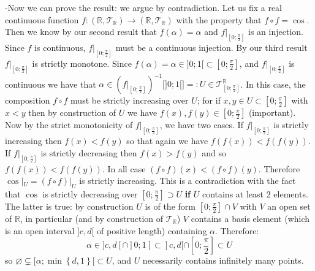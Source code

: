 \begin{solution}
    -Now we can prove the result: we argue by contradiction. Let us fix a real continuous function \( f:\left(\mathbb{R},\mathcal{T}_{\mathbb{R}}\right)\longrightarrow\left(\mathbb{R},\mathcal{T}_{\mathbb{R}}\right) \) with the property that \( f\circ f=\cos \). Then we know by our second result that \( f\left(\alpha\right)=\alpha \) and \( f|_{\left[0;\frac{\pi}{2}\right]} \) is an injection. Since \( f \) is continuous, \( f|_{\left[0;\frac{\pi}{2}\right]} \) must be a continuous injection. By our third result \( f|_{\left[0;\frac{\pi}{2}\right]} \) is strictly monotone. Since \( f\left(\alpha\right)=\alpha\in]0;1[\subset \left[0;\frac{\pi}{2}\right] \), and \( f|_{\left[0;\frac{\pi}{2}\right]} \) is continuous we have that \( \alpha\in \left(f|_{\left[0;\frac{\pi}{2}\right]}\right)^{-1}\big[]0;1[\big]=:U\in\mathcal{T}_{\left[0;\frac{\pi}{2}\right]}^{\mathbb{R}} \). In this case, the composition \( f\circ f \) must be strictly increasing over \( U \); for if \( x,y\in U\subset \left[0;\frac{\pi}{2}\right] \) with \( x<y \) then by construction of \( U \) we have \( f\left(x\right),f\left(y\right)\in \left[0;\frac{\pi}{2}\right] \) (important). Now by the strict monotonicity of \( f|_{\left[0;\frac{\pi}{2}\right]} \), we have two cases. If \( f|_{\left[0;\frac{\pi}{2}\right]} \) is strictly increasing then \( f\left(x\right)<f\left(y\right) \) so that again we have \( f\left(f\left(x\right)\right)<f\left(f\left(y\right)\right) \). If \( f|_{\left[0;\frac{\pi}{2}\right]} \) is strictly decreasing then \( f\left(x\right)>f\left(y\right) \) and so \( f\left(f\left(x\right)\right)<f\left(f\left(y\right)\right) \). In all case \( \left(f\circ f\right)\left(x\right)<\left(f\circ f\right)\left(y\right) \). Therefore \( \cos|_U=\left(f\circ f\right)|_U \) is strictly increasing. This is a contradiction with the fact that \( \cos \) is strictly decreasing over \( \left[0;\frac{\pi}{2}\right]\supset U \) \textbf{if} \( U \) contains at least \( 2 \) elements. The latter is true: by construction \( U \) is of the form \( \left[0;\frac{\pi}{2}\right]\cap V \) with \( V \) an open set of \( \mathbb{R} \), in particular (and by construction of \( \mathcal{T}_{\mathbb{R}} \)) \( V \) contains a basis element (which is an open interval \( ]c,d[ \) of positive length) containing \( \alpha \). Therefore:
    \[
        \alpha\in ]c,d\left[\cap\right]0;1\left[\subset\right]c,d[\cap\left[0;\frac{\pi}{2}\right]\subset U
    \]
    so \( \varnothing\subsetneq[\alpha;\min\left\{d,1\right\}[\subset U \), and \( U \) necessarily contains infinitely many points.
    \\\\

\end{solution}
